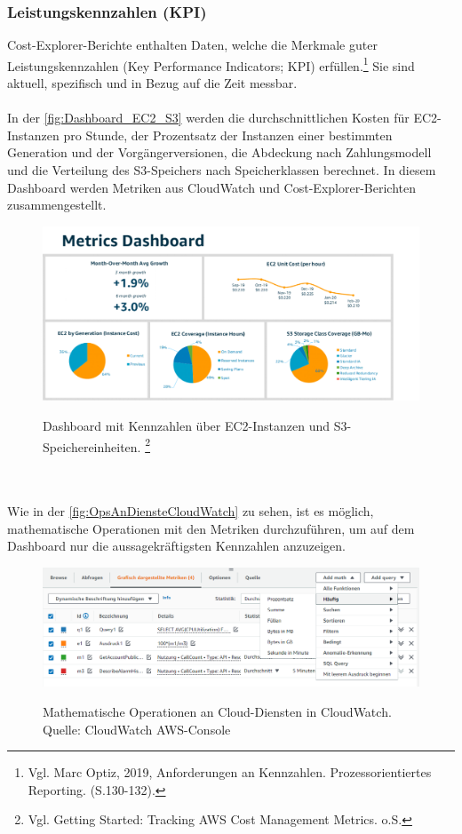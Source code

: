 \subsubsection*{Leistungskennzahlen (KPI)}
Cost-Explorer-Berichte enthalten Daten, welche die Merkmale guter Leistungskennzahlen (Key Performance Indicators; KPI) erfüllen.\footnote{Vgl. Marc Optiz, 2019, Anforderungen an Kennzahlen. Prozessorientiertes Reporting. (S.130-132).\cite{PR1}} Sie sind aktuell, spezifisch und in Bezug auf die Zeit messbar.
\\\\
In der \autoref{fig:Dashboard_EC2_S3} werden %
die durchschnittlichen Kosten für EC2-Instanzen pro Stunde, der Prozentsatz der Instanzen einer bestimmten Generation und der Vorgängerversionen, die Abdeckung nach Zahlungsmodell und die Verteilung des S3-Speichers nach Speicherklassen berechnet. In diesem Dashboard werden Metriken aus CloudWatch und Cost-Explorer-Berichten zusammengestellt.
\begin{figure}[h!]
  \centering
  \includegraphics[scale=0.65]{sources/Dashboard_EC2_S3}
  \caption[Dashboard mit EC2 und S3 Metriken]{}
  \label{fig:Dashboard_EC2_S3} 
  Dashboard mit Kennzahlen über EC2-Instanzen und S3-Speichereinheiten. \footnote{Vgl. Getting Started: Tracking AWS Cost Management Metrics. o.S.\cite{AMZ35}}
\end{figure}
\\\\
Wie in der \autoref{fig:OpsAnDiensteCloudWatch} zu sehen, ist es möglich, mathematische Operationen mit den Metriken durchzuführen, um auf dem Dashboard nur die aussagekräftigsten Kennzahlen anzuzeigen.
\begin{figure}[h!]
  \centering
  \includegraphics[scale=0.55]{sources/OpsAnDiensteCloudWatch}
  \caption[Operationen an Cloud-Diensten in CloudWatch]{}
  \label{fig:OpsAnDiensteCloudWatch} 
  Mathematische Operationen an Cloud-Diensten in CloudWatch.\\
  Quelle: CloudWatch AWS-Console
\end{figure}
